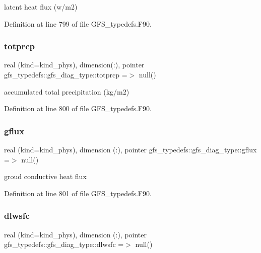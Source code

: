 latent heat flux (w/m2) 



Definition at line 799 of file G\+F\+S\+\_\+typedefs.\+F90.

\mbox{\label{structgfs__typedefs_1_1gfs__diag__type_afe1ba5a2bb3c7ece72570897086baada}} 
\subsubsection{totprcp}
{\footnotesize\ttfamily real (kind=kind\+\_\+phys), dimension(\+:), pointer gfs\+\_\+typedefs\+::gfs\+\_\+diag\+\_\+type\+::totprcp =$>$ null()}



accumulated total precipitation (kg/m2) 



Definition at line 800 of file G\+F\+S\+\_\+typedefs.\+F90.

\mbox{\label{structgfs__typedefs_1_1gfs__diag__type_a077eb0504b9127a9b109005299daf3c8}} 
\subsubsection{gflux}
{\footnotesize\ttfamily real (kind=kind\+\_\+phys), dimension  (\+:), pointer gfs\+\_\+typedefs\+::gfs\+\_\+diag\+\_\+type\+::gflux =$>$ null()}



groud conductive heat flux 



Definition at line 801 of file G\+F\+S\+\_\+typedefs.\+F90.

\mbox{\label{structgfs__typedefs_1_1gfs__diag__type_a7c96238c0f2440142668c4a73b404794}} 
\subsubsection{dlwsfc}
{\footnotesize\ttfamily real (kind=kind\+\_\+phys), dimension (\+:), pointer gfs\+\_\+typedefs\+::gfs\+\_\+diag\+\_\+type\+::dlwsfc =$>$ null()}




